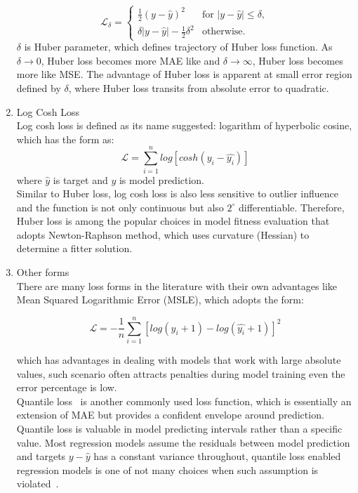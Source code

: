 \begin{enumerate}
\begin{equation}
    \mathcal{L}_\delta = \left\{ 
    \begin{array}{ll}
        \frac {1}{2} (y - \hat{y})^2 & \text{for } |y-\hat{y}| \leq \delta, \\
        \delta |y - \hat{y}| - \frac{1}{2} \delta^2 & \text{otherwise.} 
    \end{array}\right.
\end{equation}
$\delta$ is Huber parameter, which defines trajectory of Huber loss function. As $\delta \rightarrow 0$, Huber loss becomes more MAE like and $\delta \rightarrow \infty$, Huber loss becomes more like MSE. The advantage of Huber loss is apparent at small error region defined by $\delta$, where Huber loss transits from absolute error to quadratic. 
    \item Log Cosh Loss \\
Log cosh loss is defined as its name suggested: logarithm of hyperbolic cosine, which has the form as:
\begin{equation}
    \mathcal{L} = \sum_{i=1}^n log[cosh(y_i-\hat{y_i})]
\end{equation}
where $\hat{y}$ is target and $y$ is model prediction. \\
Similar to Huber loss, log cosh loss is also less sensitive to outlier influence and the function is not only continuous but also $2^{\circ}$ differentiable. Therefore, Huber loss is among the popular choices in model fitness evaluation that adopts Newton-Raphson method, which uses curvature (Hessian) to determine a fitter solution. 
    \item Other forms\\
There are many loss forms in the literature with their own advantages like Mean Squared Logarithmic Error (MSLE), which adopts the form:

\begin{equation}
    \mathcal{L} = -\frac{1}{n}\sum_{i=1}^n [log (y_i + 1) -  log(\hat{y_i} + 1) ]^2 
\end{equation}

which has advantages in dealing with models that work with large absolute values, such scenario often attracts penalties during model training even the error percentage is low. \\
Quantile loss~\cite{Yu_2003} is another commonly used loss function, which is essentially an extension of MAE but provides a confident envelope around prediction. Quantile loss is valuable in model predicting intervals rather than a specific value. Most regression models assume the residuals between model prediction and targets $y-\hat{y}$ has a constant variance throughout, quantile loss enabled regression models is one of not many choices when such assumption is violated~\cite{2019arXiv190107874T, Huang2017}.
\end{enumerate}